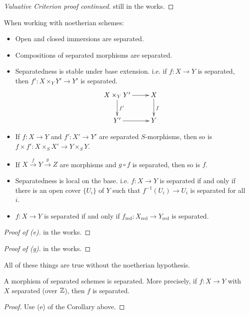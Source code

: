  \setcounter{lecture}{8}

\begin{proof}[Valuative Criterion proof continued]
still in the works.
\end{proof}

\begin{corollary}
When working with noetherian schemes: 
\begin{itemize}
 \item[(a)] Open and closed immersions are separated.
 \item[(b)] Compositions of separated morphisms are separated.
 \item[(c)] Separatedness is stable under base extension. i.e.  if
 $f:X\to Y$ is separated, then $f':X\times_Y Y' \to Y'$ is
 separated.
 \[\xymatrix{
 X\times_Y Y' \ar[r] \ar[d]^{f'} & X\ar[d]^f\\
 Y' \ar[r] & Y
}\]
 \item[(d)] If $f:X\to Y$ and $f':X'\to Y'$ are separated
 $S$-morphisms, then so is $f\times f':X\times_S X' \to Y\times_S
 Y$.
 \item[(e)] If $X\xrightarrow{f} Y \xrightarrow{g} Z$ are
 morphisms and $g\circ f$ is separated, then so is $f$.
 \item[(f)] Separatedness is local on the base.  i.e. $f:X\to Y$
 is separated if and only if there is an open cover $\{U_i\}$ of
 $Y$ such that $f^{-1}(U_i)\to U_i$ is separated for all $i$.
 \item[(g)] $f:X\to Y$ is separated if and only if
 $f_{\text{red}}:X_{\text{red}}\to Y_{\text{red}}$ is separated.
\end{itemize}
\end{corollary}
\begin{proof}[Proof of (e)]
in the works.
\end{proof}
\begin{proof}[Proof of (g)]
in the works.
\end{proof}

\begin{remark}
All of these things are true without the noetherian hypothesis.
\end{remark}

\begin{corollary}
A morphism of separated schemes is separated.  More precisely, if
$f:X\to Y$ with $X$ separated (over $\mathbb{Z}$), then $f$ is separated.
\end{corollary}
\begin{proof}
Use (e) of the Corollary above.
\end{proof}

